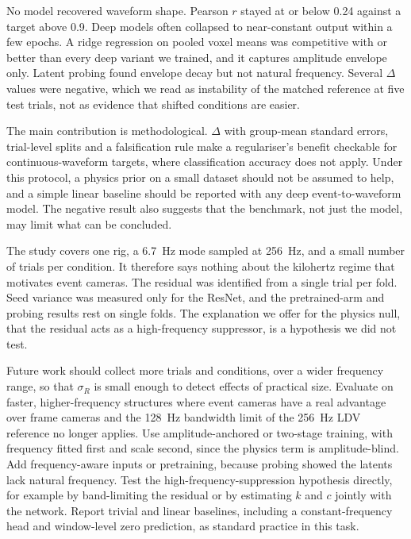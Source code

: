 \documentclass[conference]{IEEEtran}
\begin{document}
No model recovered waveform shape. Pearson $r$ stayed at or below 0.24 against a target above 0.9. Deep models often collapsed to near-constant output within a few epochs. A ridge regression on pooled voxel means was competitive with or better than every deep variant we trained, and it captures amplitude envelope only. Latent probing found envelope decay but not natural frequency. Several $\Delta$ values were negative, which we read as instability of the matched reference at five test trials, not as evidence that shifted conditions are easier.

The main contribution is methodological. $\Delta$ with group-mean standard errors, trial-level splits and a falsification rule make a regulariser's benefit checkable for continuous-waveform targets, where classification accuracy does not apply. Under this protocol, a physics prior on a small dataset should not be assumed to help, and a simple linear baseline should be reported with any deep event-to-waveform model. The negative result also suggests that the benchmark, not just the model, may limit what can be concluded.

The study covers one rig, a 6.7~Hz mode sampled at 256~Hz, and a small number of trials per condition. It therefore says nothing about the kilohertz regime that motivates event cameras. The residual was identified from a single trial per fold. Seed variance was measured only for the ResNet, and the pretrained-arm and probing results rest on single folds. The explanation we offer for the physics null, that the residual acts as a high-frequency suppressor, is a hypothesis we did not test.

Future work should collect more trials and conditions, over a wider frequency range, so that $\sigma_R$ is small enough to detect effects of practical size.
Evaluate on faster, higher-frequency structures where event cameras have a real advantage over frame cameras and the 128~Hz bandwidth limit of the 256~Hz LDV reference no longer applies.
Use amplitude-anchored or two-stage training, with frequency fitted first and scale second, since the physics term is amplitude-blind.
Add frequency-aware inputs or pretraining, because probing showed the latents lack natural frequency.
Test the high-frequency-suppression hypothesis directly, for example by band-limiting the residual or by estimating $k$ and $c$ jointly with the network.
Report trivial and linear baselines, including a constant-frequency head and window-level zero prediction, as standard practice in this task.
\end{document}
